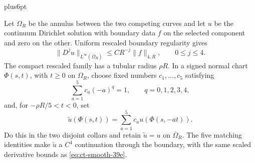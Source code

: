 \documentclass[12pt,reqno]{amsart}
\makeatletter
\theoremstyle{plain}
\theoremstyle{definition}
\theoremstyle{remark}
\renewenvironment{proof}[1][\proofname]{%
  \par
  \pushQED{\qed}%
  \normalfont
  \topsep6pt plus6pt\relax
  \trivlist
  \item[\hskip\labelsep\slshape #1\@addpunct{.}]%
  \ignorespaces
}{%
  \popQED
  \endtrivlist
  \@endpefalse
}
\DeclareRobustCommand{\qed}{%
  \leavevmode\unskip\penalty9999\hbox{}\nobreak
  \ifmmode
    \makebox[0pt][l]{\qquad\hbox{\qedsymbol}}%
  \else
    \qquad\hbox{\qedsymbol}%
  \fi
}
\renewcommand{\qedsymbol}{\rule[.47pt]{4pt}{6pt}}
\numberwithin{equation}{section}
\makeatother
\begin{document}
\begin{proof}[Proof of Lemma~\ref{lem:smooth-interface-discretization}]
Let $\Omega_R$ be the annulus between the two competing curves and let
$u$ be the continuum Dirichlet solution with boundary data $f$ on the
selected component and zero on the other.  Uniform rescaled boundary
regularity gives
\begin{equation}
\|D^ju\|_{L^\infty(\overline\Omega_R)}
       \le CR^{-j}\|f\|_{4,R},\qquad0\le j\le4.\label{eq:ct-smooth-39e}
\end{equation}
The compact rescaled family has a tubular radius $\rho R$.  In a signed
normal chart $\Phi(s,t)$, with $t\ge0$ on $\Omega_R$, choose fixed
numbers $c_1,\ldots,c_5$ satisfying
\[
\sum_{a=1}^5c_a(-a)^q=1,
             \qquad q=0,1,2,3,4,
\]
and, for $-\rho R/5<t<0$, set
\[
\widetilde u(\Phi(s,t))=\sum_{a=1}^5c_a u(\Phi(s,-at)).
\]
Do this in the two disjoint collars and retain $\widetilde u=u$ on
$\overline\Omega_R$.  The five matching identities make
$\widetilde u$ a $C^4$ continuation through the boundary, with the
same scaled derivative bounds as \eqref{eq:ct-smooth-39e}.


\end{proof}
\end{document}
